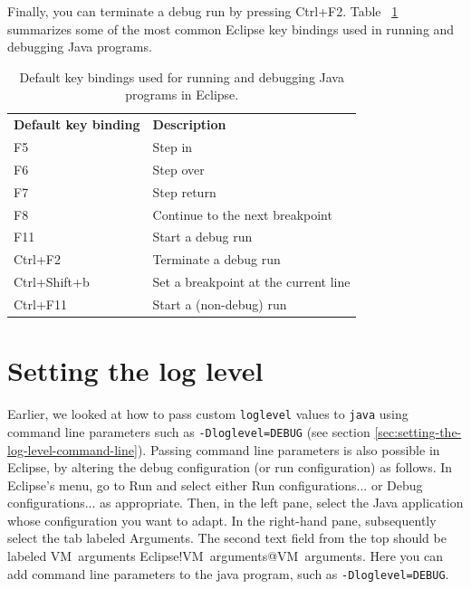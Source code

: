 \documentclass[12pt, a4paper, twoside, openany, titlepage]{book}
\begin{document}
Finally, you can terminate a debug run by pressing \textsf{Ctrl+F2}. Table~
\ref{tab:key-bindings-eclipse} summarizes some of the most common Eclipse
key bindings used in running and debugging Java programs.


\begin{table}[!ht]
\vspace{1.0em}
\caption{Default key bindings used for running and debugging Java programs
in Eclipse.\label{tab:key-bindings-eclipse}}
\begin{tabular}{lp{10cm}}
\vspace{0.5em}
\textbf{Default key binding} & \textbf{Description}                  \\
\textsf{F5}                  & Step in                               \\
\textsf{F6}                  & Step over                             \\
\textsf{F7}                  & Step return                           \\
\textsf{F8}                  & Continue to the next breakpoint       \\
\textsf{F11}                 & Start a debug run                     \\
\textsf{Ctrl+F2}             & Terminate a debug run                 \\
\textsf{Ctrl+Shift+b}        & Set a breakpoint at the current line  \\
\textsf{Ctrl+F11}            & Start a (non-debug) run               \\
\end{tabular}
\end{table}

\section{Setting the log level}

Earlier, we looked at how to pass custom \texttt{loglevel} values to \texttt
{java} using command line parameters such as \texttt{-Dloglevel=DEBUG} (see
section \ref{sec:setting-the-log-level-command-line}). Passing command line
parameters is also possible in Eclipse, by altering the debug configuration
(or run configuration) as follows. In Eclipse's menu, go to \textsf{Run} and
select either \textsf{Run configurations...} or \textsf{Debug
configurations...} as appropriate. Then, in the left pane, select the Java
application whose configuration you want to adapt. In the right-hand pane,
subsequently select the tab labeled \textsf{Arguments}. The second text
field from the top should be labeled \textsf{VM~arguments}\index
{Eclipse!VM~arguments@\textsf{VM~arguments}}. Here you can add command line
parameters to the java program, such as \texttt{-Dloglevel=DEBUG}.
\end{document}
